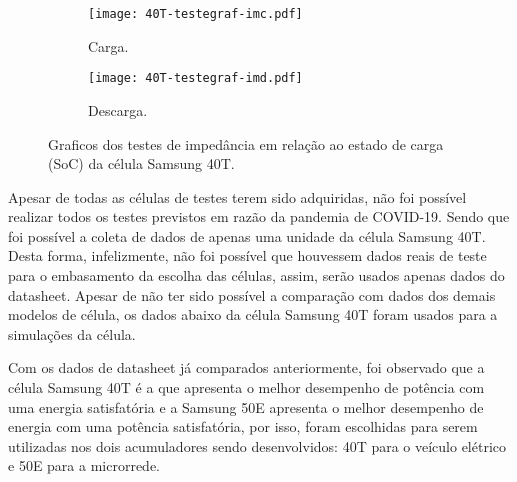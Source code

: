     \begin{figure}[!htb]
        \centering
            \begin{subfigure}{0.48\linewidth}
                \centering
                \texttt{[image: 40T-testegraf-imc.pdf]}
                \caption{Carga.}
                \label{fig:40T-testegraf-imc}
            \end{subfigure}
            \hspace*{\fill}
            \begin{subfigure}{0.48\linewidth}
                \centering
                \texttt{[image: 40T-testegraf-imd.pdf]}
                \caption{Descarga.}
                \label{fig:40T-testegraf-imd}
            \end{subfigure}
        \caption{Graficos dos testes de impedância em relação ao estado de carga (SoC) da célula Samsung 40T.}
        \label{fig:40T-testegrafs-imp}
    \end{figure}

    Apesar de todas as células de testes terem sido adquiridas, não foi possível realizar todos os testes previstos em razão da pandemia de COVID-19. Sendo que foi possível a coleta de dados de apenas uma unidade da célula Samsung 40T. Desta forma, infelizmente, não foi possível que houvessem dados reais de teste para o embasamento da escolha das células, assim, serão usados apenas dados do datasheet. Apesar de não ter sido possível a comparação com dados dos demais modelos de célula, os dados abaixo da célula Samsung 40T foram usados para a simulações da célula.

    Com os dados de datasheet já comparados anteriormente, foi observado que a célula Samsung 40T é a que apresenta o melhor desempenho de potência com uma energia satisfatória e a Samsung 50E apresenta o melhor desempenho de energia com uma potência satisfatória, por isso, foram escolhidas para serem utilizadas nos dois acumuladores sendo desenvolvidos: 40T para o veículo elétrico e 50E para a microrrede. 

